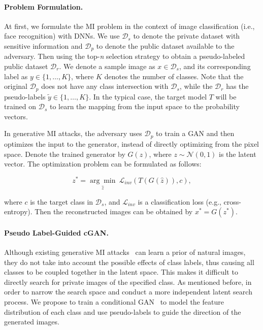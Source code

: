 \documentclass[letterpaper]{article} %
\begin{document}
\paragraph{Problem Formulation.}
At first, we formulate the MI problem in the context of image classification (i.e., face recognition) with DNNs. We use $\mathcal{D}_{s}$ to denote the private dataset with sensitive information and $\mathcal{D}_{p}$ to denote the public dataset available to the adversary. Then using the top-\emph{n} selection strategy to obtain a pseudo-labeled public dataset $\mathcal{D}_{r}$. We denote a sample image as $x \in \mathcal{D}_s$, and its corresponding label as $y \in \{1,\dots,K\}$, where $K$ denotes the number of classes. Note that the original $\mathcal{D}_{p}$ does not have any class intersection with $\mathcal{D}_{s}$, while the $\mathcal{D}_{r}$ has the pseudo-labels $\tilde{y} \in \{1,\dots,K\}$. In the typical case, the target model $T$ will be trained on $\mathcal{D}_{s}$ to learn the mapping from the input space to the probability vectors.

In generative MI attacks, the adversary uses $\mathcal{D}_p$ to train a GAN and then optimizes the input to the generator, instead of directly optimizing from the pixel space. Denote the trained generator by $G(z)$, where $z \sim \mathcal{N}(0, 1)$ is the latent vector. The optimization problem can be formulated as follows:
\begin{linenomath*}
\begin{equation}\label{eq:GMI}
z^{*} = \underset{\hat{z}}{\arg \min} \ \mathcal{L}_{inv}(T(G(\hat{z})), c),
\end{equation}
\end{linenomath*}
where $c$ is the target class in $\mathcal{D}_{s}$, and $\mathcal{L}_{inv}$ is a classification loss (e.g., cross-entropy). Then the reconstructed images can be obtained by $x^{*} = G(z^{*})$.




\paragraph{Pseudo Label-Guided cGAN.}
Although existing generative MI attacks~\cite{zhang2020secret, chen2021knowledge} can learn a prior of natural images, they do not take into account the possible effects of class labels, thus causing all classes to be coupled together in the latent space. This makes it difficult to directly search for private images of the specified class. As mentioned before, in order to narrow the search space and conduct a more independent latent search process. We propose to train a conditional GAN~\cite{miyato2018cgans} to model the feature distribution of each class and use pseudo-labels to guide the direction of the generated images.
\end{document}

